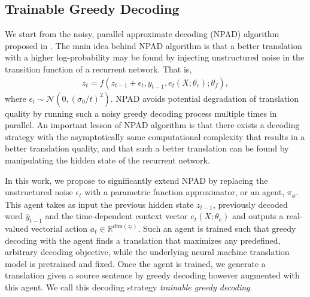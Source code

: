 \subsection{Trainable Greedy Decoding}

We start from the noisy, parallel approximate decoding (NPAD) algorithm proposed in \citep{cho2016noisy}. The main idea behind NPAD algorithm is that a better translation with a higher log-probability may be found by injecting unstructured noise in the transition function of a recurrent network. That is,
\begin{align*}
z_t = f(z_{t-1} + \epsilon_t, y_{t-1}, e_t(X; \theta_e); \theta_f),
\end{align*}
where $\epsilon_t \sim \mathcal{N}(0, (\sigma_0/t)^2)$. NPAD avoids potential degradation of translation quality by running such a noisy greedy decoding process multiple times in parallel. An important lesson of NPAD algorithm is that there exists a decoding strategy with the asymptotically same computational complexity that results in a better translation quality, and that such a better translation can be found by manipulating the hidden state of the recurrent network. 

In this work, we propose to significantly extend NPAD by replacing the unstructured noise $\epsilon_t$ with a parametric function approximator, or an agent, $\pi_{\phi}$. This agent takes as input the previous hidden state $z_{t-1}$, previously decoded word $\hat{y}_{t-1}$ and the time-dependent context vector $e_t(X; \theta_e)$ and outputs a real-valued vectorial action $a_t \in \mathbb{R}^{\text{dim}(z_t)}$. Such an agent is trained such that greedy decoding with the agent finds a translation that maximizes any predefined, arbitrary decoding objective, while the underlying neural machine translation model is pretrained and fixed. Once the agent is trained, we generate a translation given a source sentence by greedy decoding however augmented with this agent. We call this decoding strategy {\it trainable greedy decoding}. 



